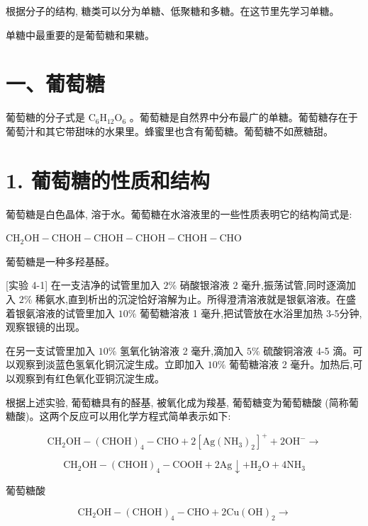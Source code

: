 \documentclass[10pt]{article}
\begin{document}
根据分子的结构, 糖类可以分为单糖、低聚糖和多糖。在这节里先学习单糖。

单糖中最重要的是葡萄糖和果糖。

\section*{一、葡萄糖}

葡萄糖的分子式是 \({\mathrm{C}}_{6}{\mathrm{H}}_{12}{\mathrm{O}}_{6}\) 。葡萄糖是自然界中分布最广的单糖。葡萄糖存在于葡萄汁和其它带甜味的水果里。蜂蜜里也含有葡萄糖。葡萄糖不如蔗糖甜。

\section*{1. 葡萄糖的性质和结构}

葡萄糖是白色晶体, 溶于水。葡萄糖在水溶液里的一些性质表明它的结构简式是:

\({\mathrm{{CH}}}_{2}\mathrm{{OH}} - \mathrm{{CHOH}} - \mathrm{{CHOH}} - \mathrm{{CHOH}} - \mathrm{{CHOH}} - \mathrm{{CHO}}\)

葡萄糖是一种多羟基醛。

[实验 4-1] 在一支洁净的试管里加入 \(2\%\) 硝酸银溶液 2 毫升,振荡试管,同时逐滴加入 \(2\%\) 稀氨水,直到析出的沉淀恰好溶解为止。所得澄清溶液就是银氨溶液。在盛着银氨溶液的试管里加入 \({10}\%\) 葡萄糖溶液 1 毫升,把试管放在水浴里加热 3-5分钟, 观察银镜的出现。

在另一支试管里加入 \({10}\%\) 氢氧化钠溶液 2 毫升,滴加入 \(5\%\) 硫酸铜溶液 4-5 滴。可以观察到淡蓝色氢氧化铜沉淀生成。立即加入 \({10}\%\) 葡萄糖溶液 2 毫升。加热后,可以观察到有红色氧化亚铜沉淀生成。

根据上述实验, 葡萄糖具有的醛基, 被氧化成为羧基, 葡萄糖变为葡萄糖酸 (简称葡糖酸)。这两个反应可以用化学方程式简单表示如下:

\[
{\mathrm{{CH}}}_{2}\mathrm{{OH}} - {\left( \mathrm{{CHOH}}\right) }_{4} - \mathrm{{CHO}} + 2{\left\lbrack \mathrm{{Ag}}{\left( {\mathrm{{NH}}}_{3}\right) }_{2}\right\rbrack }^{ + } + 2{\mathrm{{OH}}}^{ - } \rightarrow
\]

\[
{\mathrm{{CH}}}_{2}\mathrm{{OH}} - {\left( \mathrm{{CHOH}}\right) }_{4} - \mathrm{{COOH}} + 2\mathrm{{Ag}} \downarrow + {\mathrm{H}}_{2}\mathrm{O} + 4{\mathrm{{NH}}}_{3}
\]

葡萄糖酸

\[
{\mathrm{{CH}}}_{2}\mathrm{{OH}} - {\left( \mathrm{{CHOH}}\right) }_{4} - \mathrm{{CHO}} + 2\mathrm{{Cu}}{\left( \mathrm{{OH}}\right) }_{2} \rightarrow
\]
\end{document}
